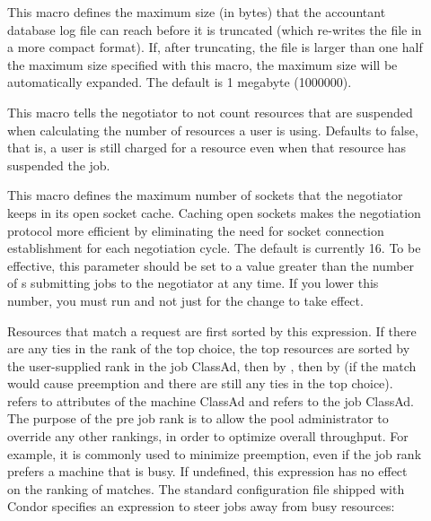 \begin{description}
\item[] 
  \label{param:MaxAccountantDatabaseSize}
  This macro defines the maximum size (in bytes) that the accountant
  database log file can reach before it is truncated (which re-writes
  the file in a more compact format).
  If, after truncating, the file is larger than one half the maximum
  size specified with this macro, the maximum size will be
  automatically expanded.
  The default is 1 megabyte (1000000).

\item[] \label{param:NegotiatorDiscountSuspendedResources} 
   This macro tells the negotiator to not count resources that are suspended
   when calculating the number of resources a user is using. 
   Defaults to false, that is, a user is still charged for a resource even
   when that resource has suspended the job.

\item[]
  \label{param:NegotiatorSocketCacheSize} This macro defines the
  maximum number of sockets that the negotiator keeps in its
  open socket cache.  Caching open sockets makes the negotiation
  protocol more efficient by eliminating the need for socket
  connection establishment for each negotiation cycle.  The default is
  currently 16.  To be effective, this parameter should be set to a
  value greater than the number of s submitting jobs to the
  negotiator at any time.  If you lower this number, you must run
   and not just  for the change to
  take effect.

\item[]
  \label{param:NegotiatorPreJobRank} Resources that match a request
  are first sorted by this expression.  If there are any ties in the
  rank of the top choice, the top resources are sorted by the
  user-supplied rank in the job ClassAd, then by
  , then by
   (if the match would cause preemption and
  there are still any ties in the top choice).  \verb@MY@ refers to
  attributes of the machine ClassAd and \verb@TARGET@ refers to the
  job ClassAd.  The purpose of the pre job rank is to allow the pool
  administrator to override any other rankings, in order to optimize
  overall throughput.  For example, it is commonly used to minimize
  preemption, even if the job rank prefers a machine that is busy.  If
  undefined, this expression has no effect on the ranking of matches.
  The standard configuration file shipped with Condor specifies an
  expression to steer jobs away from busy resources:


\end{description}
